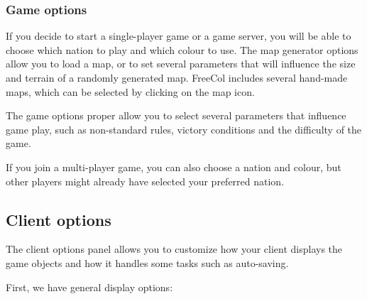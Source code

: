 \documentclass[12pt]{article}
\begin{document}
\hypertarget{Game options}{\subsubsection{Game options}}

If you decide to start a single-player game or a game server, you will
be able to choose which nation to play and which colour to use. The
\hypertarget{map generator options}{map generator options} allow you
to load a map, or to set several parameters that will influence the
size and terrain of a randomly generated map. FreeCol includes several
hand-made maps, which can be selected by clicking on the map icon.

The game options proper allow you to select several parameters that
influence game play, such as non-standard rules, victory conditions
and the difficulty of the game.

If you join a multi-player game, you can also choose a nation and
colour, but other players might already have selected your preferred
nation.


\hypertarget{Client options}{\subsection{Client options}}

The client options panel allows you to customize how your client
displays the game objects and how it handles some tasks such as
auto-saving.

First, we have general \hypertarget{display options}{display options}:
\end{document}
